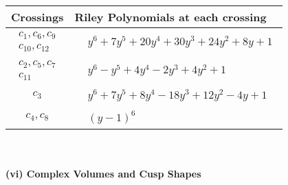 \documentclass[1p]{elsarticle_modified}
\theoremstyle{definition}
\begin{document}
\begin{tabular}{m{50pt}|m{274pt}}
Crossings & \hspace{64pt}Riley Polynomials at each crossing \\
\hline $$\begin{aligned}c_{1},c_{6},c_{9}\\c_{10},c_{12}\end{aligned}$$&$\begin{aligned}
&y^6+7 y^5+20 y^4+30 y^3+24 y^2+8 y+1
\end{aligned}$\\
\hline $$\begin{aligned}c_{2},c_{5},c_{7}\\c_{11}\end{aligned}$$&$\begin{aligned}
&y^6- y^5+4 y^4-2 y^3+4 y^2+1
\end{aligned}$\\
\hline $$\begin{aligned}c_{3}\end{aligned}$$&$\begin{aligned}
&y^6+7 y^5+8 y^4-18 y^3+12 y^2-4 y+1
\end{aligned}$\\
\hline $$\begin{aligned}c_{4},c_{8}\end{aligned}$$&$\begin{aligned}
&(y-1)^6
\end{aligned}$\\
\hline
\end{tabular}\\~\\
\newpage\flushleft \textbf{(vi) Complex Volumes and Cusp Shapes}
\end{document}
